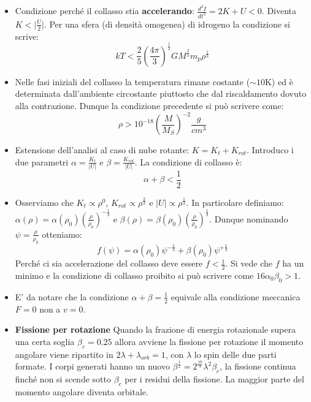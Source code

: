 \documentclass[11pt,a4paper]{article}
\begin{document}
\begin{itemize}
\item Condizione perché il collasso stia \textbf{accelerando}: $\frac{d^2 I}{dt^2} = 2K + U < 0$. Diventa $K < \Big | \frac{U}{2} \Big|$. Per una sfera (di densità omogenea) di idrogeno la condizione si scrive:
\begin{equation}
kT < \frac{2}{5} \left( \frac{4 \pi}{3} \right) ^{\frac{1}{3}} G M^{\frac{2}{3}} m_p \rho^{\frac{1}{3}}
\end{equation}

\item Nelle fasi iniziali del collasso la temperatura rimane costante ($\sim 10 \si{\kelvin}$) ed è determinata dall'ambiente circostante piuttosto che dal riscaldamento dovuto alla contrazione. Dunque la condizione precedente si può scrivere come:
\begin{equation}
\rho > 10^{-18} \left( \frac{M}{M_{S}} \right) ^{-2} \frac{g}{cm^3}
\end{equation}

\item Estensione dell'analisi al caso di nube rotante: $K = K_t + K_{rot}$. Introduco i due parametri $\alpha = \frac{K_t}{|U|}$ e $\beta = \frac{K_{rot}}{|U|}$. La condizione di collasso è:
\begin{equation}
\alpha + \beta < \frac{1}{2}
\end{equation}

\item Osserviamo che $K_t \propto \rho^0$, $K_{rot} \propto \rho^{\frac{2}{3}}$ e $|U| \propto \rho^{\frac{1}{3}}$. In particolare definiamo: $\alpha(\rho) = \alpha(\rho_0) \left( \frac{\rho}{\rho_0} \right) ^ {-\frac{1}{3}}$ e $\beta(\rho) = \beta(\rho_0) \left( \frac{\rho}{\rho_0} \right) ^ {\frac{1}{3}}$. Dunque nominando $\psi = \frac{\rho}{\rho_0}$ otteniamo:
\begin{equation}
f(\psi) = \alpha (\rho_0) \psi^{-\frac{1}{3}} +  \beta (\rho_0) \psi^{+\frac{1}{3}}
\end{equation}
Perché ci sia accelerazione del collasso deve essere $f < \frac{1}{2}$. Si vede che $f$ ha un minimo e la condizione di collasso proibito si può scrivere come $16 \alpha_0 \beta_0 > 1$.

\item E' da notare che la condizione $\alpha + \beta = \frac{1}{2}$ equivale alla condizione meccanica $F = 0$ non a $v = 0$.

\item \textbf{Fissione per rotazione} Quando la frazione di energia rotazionale supera una certa soglia $\beta_c = 0.25$ allora avviene la fissione per rotazione il momento angolare viene ripartito in $2\lambda+\lambda_{orb} = 1$, con $\lambda$ lo spin delle due parti formate. I corpi generati hanno un nuovo $\beta^{\frac{1}{2}} = 2^{\frac{10}{3}} \lambda^2 \beta_c$, la fissione continua finché non si scende sotto $\beta_c$ per i residui della fissione. La maggior parte del momento angolare diventa orbitale.


\end{itemize}
\end{document}
